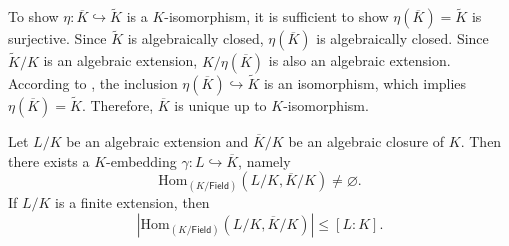 \begin{prf}
To show $\eta: \overline{K}\hookrightarrow \widetilde{K}$ is a $K$-isomorphism, it is sufficient to show $\eta(\overline{K})= \widetilde{K}$ is surjective. Since $\widetilde{K}$ is algebraically closed, $\eta(\overline{K})$ is algebraically closed. Since $\widetilde{K}/K$ is an algebraic extension, $K/\eta(\overline{K})$ is also an algebraic extension. According to , the inclusion $\eta(\overline{K})\hookrightarrow \widetilde{K}$ is an isomorphism, which implies $\eta(\overline{K})=\widetilde{K}$. Therefore, $\overline{K}$ is unique up to $K$-isomorphism.
\end{prf}

\begin{proposition}{}{}
    Let $L/K$ be an algebraic extension and $\overline{K}/K$ be an algebraic closure of $K$. Then there exists a $K$-embedding $\gamma:L\hookrightarrow \overline{K}$, namely
    \[
        \mathrm{Hom}_{(K/\mathsf{Field})}(L/K,\overline{K}/K)\ne \varnothing.
    \]
    If $L/K$ is a finite extension, then 
    \[
    |\mathrm{Hom}_{(K/\mathsf{Field})}(L/K,\overline{K}/K)|\le \left[L:K\right].
    \]
\end{proposition}
